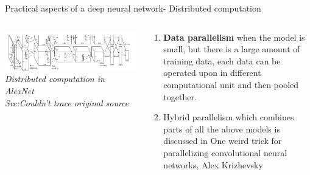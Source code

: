 \begin{frame}{Practical aspects of a deep neural network- Distributed computation}
	\begin{columns}[T]
        \begin{column}{0.4\textwidth}
        	\includegraphics[width=\textwidth]{images/GPU division.png}
			\tiny{\textit{Distributed computation in AlexNet\\ Src:Couldn't trace original source}}
        \end{column}
	    \begin{column}{0.6\textwidth} 
			\begin{enumerate}[$\bullet$]
				\item \textbf{Data parallelism} when the model is small, but there is a large amount of training data, each data can be operated upon in different computational unit and then pooled together.\pause
				\item Hybrid parallelism which combines  parts of all the above models is discussed in One weird trick for parallelizing convolutional neural networks, Alex Krizhevsky
			\end{enumerate}
    	\end{column}
    \end{columns}
\end{frame}

